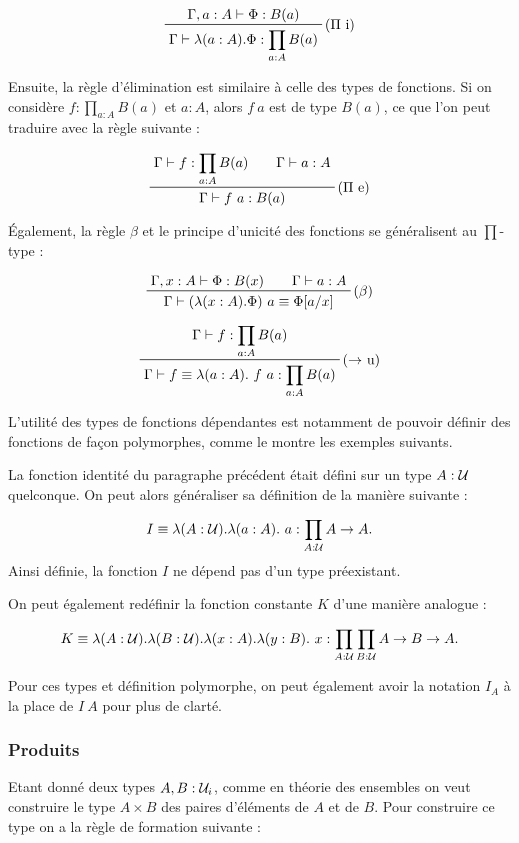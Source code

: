 \documentclass[../../rapport.tex]{subfiles}
\begin{document}
  $$
  \prftree[r]{($\Pi$ i)}{\Gamma, a : A \vdash \Phi : B(a)}
    {\Gamma \vdash \lambda(a : A). \Phi : \prod_{a:A}{B(a)}}
  $$

  Ensuite, la règle d'élimination est similaire à celle des types de fonctions.
  Si on considère $f : \prod_{a:A}B(a)$ et $a : A$, alors $f\ a$ est de type $B(a)$,
  ce que l'on peut traduire avec la règle suivante :

  $$
  \prfinterspace=2em
  \prftree[r]{($\Pi$ e)}{\Gamma \vdash f : \prod_{a:A}{B(a)}}{\Gamma \vdash a : A}
    {\Gamma \vdash f\ a : B(a)}
  $$

  Également, la règle $\beta$ et le principe d'unicité des fonctions se généralisent au $\prod$-type :

  $$
  \prfinterspace=2em
  \prftree[r]{($\beta$)}{\Gamma, x : A \vdash \Phi : B(x)}{\Gamma \vdash a : A}
    {\Gamma \vdash (\lambda(x : A).\Phi)\ a \equiv \Phi[a/x]}
  $$

  $$
  \prftree[r]{($\fun$ u)}
    {\Gamma \vdash f : \prod_{a : A}B(a)}
  {\Gamma \vdash f \equiv \lambda(a : A).\ f\ a : \prod_{a:A}B(a)}
  $$

  L'utilité des types de fonctions dépendantes est notamment de pouvoir définir des fonctions de façon polymorphes,
  comme le montre les exemples suivants.

  \begin{example}
    La fonction identité du paragraphe précédent était défini sur un type $A : \mathcal U$ quelconque.
    On peut alors généraliser sa définition de la manière suivante :

    $$I \equiv \lambda (A : \mathcal U). \lambda (a : A).\ a : \prod_{A : \mathcal U}{A \rightarrow A}.$$
    Ainsi définie, la fonction $I$ ne dépend pas d'un type préexistant.

    On peut également redéfinir la fonction constante $K$ d'une manière analogue :

    $$K \equiv \lambda (A : \mathcal U). \lambda (B : \mathcal U). \lambda (x : A). \lambda (y : B).\ x :
      \prod_{A : \mathcal U}\prod_{B : \mathcal U}{A \rightarrow B \rightarrow A}.$$

    Pour ces types et définition polymorphe, on peut également avoir la notation $I_A$ à la place de $I\ A$
    pour plus de clarté.
  \end{example}

  \subsubsection{Produits}

  Etant donné deux types $A, B : \mathcal U_i$, comme en théorie des ensembles on veut construire le type $A \times B$ des paires d'éléments
  de $A$ et de $B$. Pour construire ce type on a la règle de formation suivante :
\end{document}

